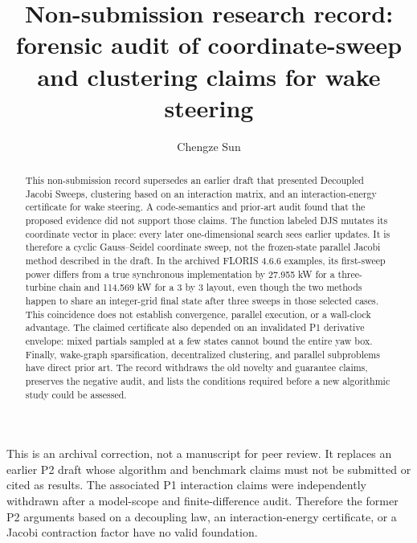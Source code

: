\documentclass[wes, manuscript]{copernicus}
\begin{document}
\title{Non-submission research record: forensic audit of coordinate-sweep and clustering claims for wake steering}
\author[1]{Chengze Sun}
\received{}
\pubdiscuss{}
\revised{}
\accepted{}
\published{}

\maketitle

\begin{abstract}
This non-submission record supersedes an earlier draft that presented Decoupled Jacobi Sweeps, clustering based on an interaction matrix, and an interaction-energy certificate for wake steering. A code-semantics and prior-art audit found that the proposed evidence did not support those claims. The function labeled DJS mutates its coordinate vector in place: every later one-dimensional search sees earlier updates. It is therefore a cyclic Gauss--Seidel coordinate sweep, not the frozen-state parallel Jacobi method described in the draft. In the archived FLORIS 4.6.6 examples, its first-sweep power differs from a true synchronous implementation by 27.955 kW for a three-turbine chain and 114.569 kW for a 3 by 3 layout, even though the two methods happen to share an integer-grid final state after three sweeps in those selected cases. This coincidence does not establish convergence, parallel execution, or a wall-clock advantage. The claimed certificate also depended on an invalidated P1 derivative envelope: mixed partials sampled at a few states cannot bound the entire yaw box. Finally, wake-graph sparsification, decentralized clustering, and parallel subproblems have direct prior art. The record withdraws the old novelty and guarantee claims, preserves the negative audit, and lists the conditions required before a new algorithmic study could be assessed.
\end{abstract}

\introduction
\label{sec:introduction}

This is an archival correction, not a manuscript for peer review. It replaces an earlier P2 draft whose algorithm and benchmark claims must not be submitted or cited as results. The associated P1 interaction claims were independently withdrawn after a model-scope and finite-difference audit. Therefore the former P2 arguments based on a decoupling law, an interaction-energy certificate, or a Jacobi contraction factor have no valid foundation.
\end{document}
